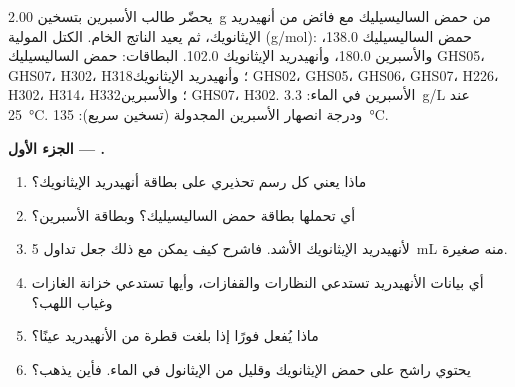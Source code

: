 \begin{problem}
\label{pb:b1:lab-techniques-1:1}
يحضّر طالب الأسبرين بتسخين \qty{2.00}{g} من حمض الساليسيليك مع
فائض من أنهيدريد الإيثانويك، ثم يعيد  الناتج الخام.
الكتل المولية (\unit{g/mol}): حمض الساليسيليك  138.0، والأسبرين
 180.0، وأنهيدريد الإيثانويك  102.0. البطاقات:
حمض الساليسيليك GHS05، GHS07، H302، H318؛ وأنهيدريد الإيثانويك GHS02،
GHS05، GHS06، GHS07، H226، H302، H314، H332؛ والأسبرين GHS07، H302.
 الأسبرين في الماء: \qty{3.3}{g/L} عند \qty{25}{\celsius}.
ودرجة انصهار الأسبرين المجدولة (تسخين سريع): \qty{135}{\celsius}.

\medskip
\noindent\textbf{الجزء الأول --- .}
\begin{enumerate}
  \item ماذا يعني كل رسم تحذيري على بطاقة أنهيدريد الإيثانويك؟
  \item أي  تحملها بطاقة حمض الساليسيليك؟ وبطاقة
        الأسبرين؟
  \item لأنهيدريد الإيثانويك  الأشد. فاشرح كيف يمكن مع ذلك جعل
         تداول \qty{5}{mL} منه صغيرة.
  \item أي بيانات الأنهيدريد تستدعي النظارات والقفازات،
        وأيها تستدعي خزانة الغازات وغياب اللهب؟
  \item ماذا يُفعل فورًا إذا بلغت قطرة من الأنهيدريد عينًا؟
  \item يحتوي راشح  على حمض الإيثانويك
        وقليل من الإيثانول في الماء. فأين يذهب؟
\end{enumerate}


\end{problem}
